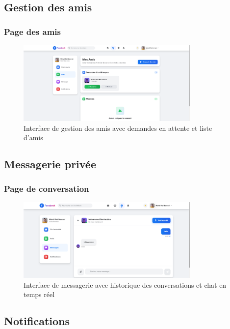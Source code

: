 \documentclass[12pt,a4paper]{article}
\begin{document}
\subsection{Gestion des amis}

\subsubsection{Page des amis}
\begin{figure}[H]
    \centering
    \includegraphics[width=0.8\textwidth]{screenshots/friends.png}
    \caption{Interface de gestion des amis avec demandes en attente et liste d'amis}
    \label{fig:friends}
\end{figure}

\subsection{Messagerie priv\'ee}

\subsubsection{Page de conversation}
\begin{figure}[H]
    \centering
    \includegraphics[width=0.8\textwidth]{screenshots/conversation.png}
    \caption{Interface de messagerie avec historique des conversations et chat en temps r\'eel}
    \label{fig:conversation}
\end{figure}

\subsection{Notifications}
\end{document}
